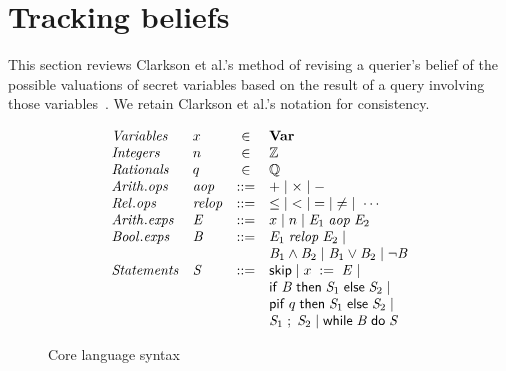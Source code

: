 \section{Tracking beliefs}
\label{sec:belief}

This section reviews Clarkson et al.'s method of revising a querier's
belief of the possible valuations of secret variables based on the
result of a query involving those
variables~\cite{clarkson09quantifying}.  We retain Clarkson et al.'s
notation for consistency.

\begin{figure}[t]
\[
\begin{array}{llcl}
\mathit{Variables} & x & \in & \vars \\ 
\mathit{Integers} & n & \in & \Integer \\
\mathit{Rationals} & q & \in & \Rational \\
\mathit{Arith. ops} & \arithop &::= & + \mid \times \mid - \\
\mathit{Rel. ops} & \relop &::= & \leq \;\mid\; < \;\mid\; = \;\mid\; \neq \;\mid\; \cdots
\\
\mathit{Arith. exps} & \aexp &::= & x \mid n \mid \aop{\aexp_1}{\aexp_2} \\
\mathit{Bool. exps} & \bexp &::= & \bop{\aexp_1}{\aexp_2} \mid \\
& && \bexp_1 \wedge \bexp_2 \mid \bexp_1 \vee \bexp_2 \mid \aneg{\bexp} \\

\mathit{Statements} & \stmt &::= & \sskip \mid \sassign{x}{\aexp} \mid \\
&     && \sif{\bexp}{\stmt_1}{\stmt_2} \mid \\
&     && \spif{q}{\stmt_1}{\stmt_2} \mid \\
&     && \sseq{\stmt_1}{\stmt_2} \mid \swhile{\bexp}{\stmt} %
\end{array}
\]
\caption{Core language syntax}
\label{fig:syntax}
\end{figure}

